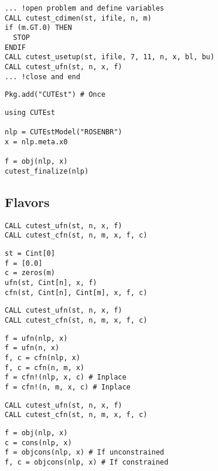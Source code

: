 \begin{frame}[t,fragile]
  \begin{verbatim}
... !open problem and define variables
CALL cutest_cdimen(st, ifile, n, m)
if (m.GT.0) THEN
  STOP
ENDIF
CALL cutest_usetup(st, ifile, 7, 11, n, x, bl, bu)
CALL cutest_ufn(st, n, x, f)
... !close and end
\end{verbatim}
\end{frame}

\begin{frame}[t,fragile]
  \begin{verbatim}
Pkg.add("CUTEst") # Once
\end{verbatim}
\begin{verbatim}
using CUTEst

nlp = CUTEstModel("ROSENBR")
x = nlp.meta.x0

f = obj(nlp, x)
cutest_finalize(nlp)
\end{verbatim}
\end{frame}

\subsection{Flavors}

\begin{frame}[t,fragile]
\begin{verbatim}
CALL cutest_ufn(st, n, x, f)
CALL cutest_cfn(st, n, m, x, f, c)
\end{verbatim}
\begin{verbatim}
st = Cint[0]
f = [0.0]
c = zeros(m)
ufn(st, Cint[n], x, f)
cfn(st, Cint[n], Cint[m], x, f, c)
\end{verbatim}
\end{frame}

\begin{frame}[t,fragile]
\begin{verbatim}
CALL cutest_ufn(st, n, x, f)
CALL cutest_cfn(st, n, m, x, f, c)
\end{verbatim}
\begin{verbatim}
f = ufn(nlp, x)
f = ufn(n, x)
f, c = cfn(nlp, x)
f, c = cfn(n, m, x)
f = cfn!(nlp, x, c) # Inplace
f = cfn!(n, m, x, c) # Inplace
\end{verbatim}
\end{frame}

\begin{frame}[t,fragile]
\begin{verbatim}
CALL cutest_ufn(st, n, x, f)
CALL cutest_cfn(st, n, m, x, f, c)
\end{verbatim}
\begin{verbatim}
f = obj(nlp, x)
c = cons(nlp, x)
f = objcons(nlp, x) # If unconstrained
f, c = objcons(nlp, x) # If constrained
\end{verbatim}
\end{frame}

